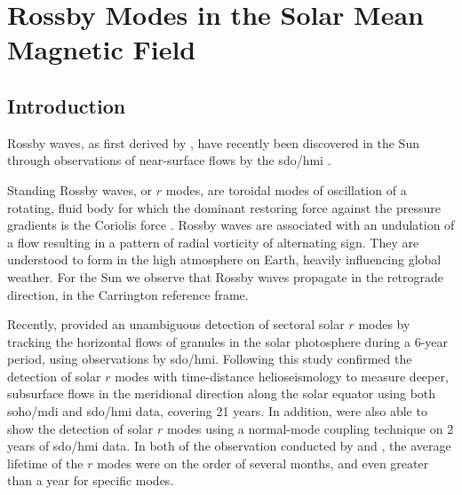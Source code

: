 \chapter{Rossby Modes in the Solar Mean Magnetic Field}\label{chap:rmode}

\section{Introduction}\label{sec:rmode_intro}


Rossby waves, as first derived by \citet{rossby_relation_1939}, have recently been discovered in the Sun through observations of near-surface flows by the \gls{sdo/hmi} \citep{loptien_global-scale_2018, liang_time-distance_2019}.

Standing Rossby waves, or $r$ modes, are toroidal modes of oscillation of a rotating, fluid body for which the dominant restoring force against the pressure gradients is the Coriolis force \citep{lanza_sectoral_2019, hathaway_hydrodynamic_2020}. Rossby waves are associated with an undulation of a flow resulting in a pattern of radial vorticity of alternating sign. They are understood to form in the high atmosphere on Earth, heavily influencing global weather. For the Sun we observe that Rossby waves propagate in the retrograde direction, in the Carrington reference frame.

Recently, \citet{loptien_global-scale_2018} provided an unambiguous detection of sectoral solar $r$ modes by tracking the horizontal flows of granules in the solar photosphere during a 6-year period, using observations by \gls{sdo/hmi}. Following this study \citet{liang_time-distance_2019} confirmed the detection of solar $r$ modes with time-distance helioseismology to measure deeper, subsurface flows in the meridional direction along the solar equator using both \gls{soho/mdi} and \gls{sdo/hmi} data, covering 21 years. In addition, \citet{hanasoge_detection_2019} were also able to show the detection of solar $r$ modes using a normal-mode coupling technique on 2 years of \gls{sdo/hmi} data. In both of the observation conducted by \citet{loptien_global-scale_2018} and \citet{liang_time-distance_2019}, the average lifetime of the $r$ modes were on the order of several months, and even greater than a year for specific modes.

